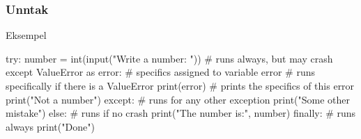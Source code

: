 \begin{frame}[fragile]
    \frametitle{Unntak}

    Eksempel

\begin{python}
try:
    number = int(input("Write a number: ")) # runs always, but may crash
except ValueError as error: # specifics assigned to variable error
    # runs specifically if there is a ValueError
    print(error) # prints the specifics of this error
    print("Not a number")
except: # runs for any other exception
    print("Some other mistake")
else: # runs if no crash
    print("The number is:", number) 
finally: # runs always
    print("Done")
\end{python}

\end{frame}





